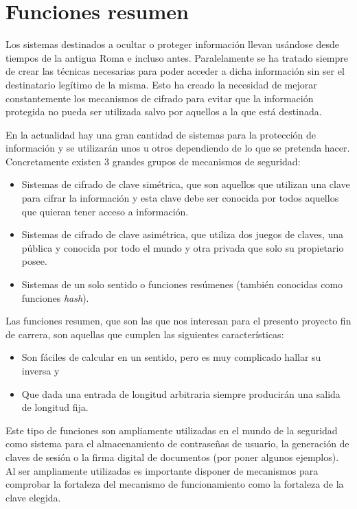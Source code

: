 \chapter{Funciones resumen}

Los sistemas destinados a ocultar o proteger información llevan usándose desde tiempos de la antigua Roma \cite{Luciano87cryptology:from} e incluso antes. Paralelamente se ha tratado siempre de crear las técnicas necesarias para poder acceder a dicha información sin ser el destinatario legítimo de la misma. Esto ha creado la necesidad de mejorar constantemente los mecanismos de cifrado para evitar que la información protegida no pueda ser utilizada salvo por aquellos a la que está destinada.

En la actualidad hay una gran cantidad de sistemas para la protección de información y se utilizarán unos u otros dependiendo de lo que se pretenda hacer. Concretamente existen 3 grandes grupos de mecanismos de seguridad:
\begin{itemize}
	\item Sistemas de cifrado de clave simétrica, que son aquellos que utilizan una clave para cifrar la información y esta clave debe ser conocida por todos aquellos que quieran tener acceso a información.
	\item Sistemas de cifrado de clave asimétrica, que utiliza dos juegos de claves, una pública y conocida por todo el mundo y otra privada que solo su propietario posee.
	\item Sistemas de un solo sentido o funciones resúmenes (también conocidas como funciones \emph{hash}).
\end{itemize}

Las funciones resumen, que son las que nos interesan para el presento proyecto fin de carrera, son aquellas que cumplen las siguientes características:

\begin{itemize}
	\item Son fáciles de calcular en un sentido, pero es muy complicado hallar su inversa y
	\item Que dada una entrada de longitud arbitraria siempre producirán una salida de longitud fija.
\end{itemize}

Este tipo de funciones son ampliamente utilizadas en el mundo de la seguridad como sistema para el almacenamiento de contraseñas de usuario, la generación de claves de sesión o la firma digital de documentos (por poner algunos ejemplos). Al ser ampliamente utilizadas es importante disponer de mecanismos para comprobar la fortaleza del mecanismo de funcionamiento como la fortaleza de la clave elegida.

